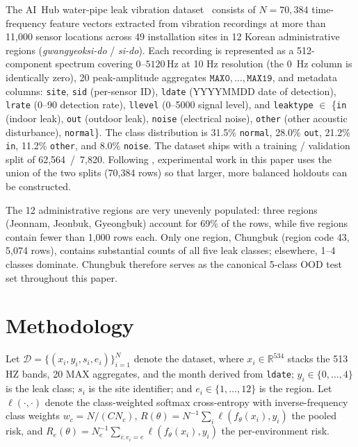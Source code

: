 \documentclass[sensors,article,submit,pdftex,oneauthor]{Definitions/mdpi}
\begin{document}
The AI~Hub water-pipe leak vibration
dataset~\cite{lee2023leak} consists of $N = 70{,}384$
time-frequency feature vectors extracted from vibration
recordings at more than 11{,}000 sensor locations across 49
installation sites in 12 Korean administrative regions
(\emph{gwangyeoksi-do} / \emph{si-do}). Each recording is
represented as a 512-component spectrum covering
$0$--$5120\,\text{Hz}$ at 10 Hz resolution (the 0~Hz column is
identically zero), 20 peak-amplitude aggregates
$\texttt{MAX0}, \dots, \texttt{MAX19}$, and metadata columns:
\texttt{site}, \texttt{sid} (per-sensor ID), \texttt{ldate}
(YYYYMMDD date of detection), \texttt{lrate} (0--90 detection
rate), \texttt{llevel} (0--5000 signal level), and
\texttt{leaktype} $\in$ \{\texttt{in} (indoor leak), \texttt{out}
(outdoor leak), \texttt{noise} (electrical noise),
\texttt{other} (other acoustic disturbance),
\texttt{normal}\}. The class distribution is 31.5\%
\texttt{normal}, 28.0\% \texttt{out}, 21.2\% \texttt{in}, 11.2\%
\texttt{other}, and 8.0\% \texttt{noise}. The dataset ships
with a training / validation split of 62{,}564~/~7{,}820.
Following \cite{lee2023leak}, experimental work in this paper
uses the union of the two splits (70{,}384 rows) so that larger,
more balanced holdouts can be constructed.

The 12 administrative regions are very unevenly populated:
three regions (Jeonnam, Jeonbuk, Gyeongbuk) account for
69\% of the rows, while five regions contain fewer than 1{,}000
rows each. Only one region, Chungbuk (region code 43,
5{,}074 rows), contains substantial counts of all five leak
classes; elsewhere, 1--4 classes dominate. Chungbuk therefore
serves as the canonical 5-class OOD test set throughout this
paper.

\section{Methodology}\label{sec:methodology}

Let $\mathcal{D} = \{(x_i, y_i, s_i, e_i)\}_{i=1}^{N}$ denote
the dataset, where $x_i \in \mathbb{R}^{534}$ stacks the 513 HZ
bands, 20 MAX aggregates, and the month derived from
\texttt{ldate}; $y_i \in \{0,\dots,4\}$ is the leak class;
$s_i$ is the site identifier; and $e_i \in \{1,\dots,12\}$ is
the region. Let $\ell(\cdot,\cdot)$ denote the class-weighted
softmax cross-entropy with inverse-frequency class weights
$w_c = N / (CN_c)$, $R(\theta) = N^{-1}\sum_i \ell(f_\theta(x_i),
y_i)$ the pooled risk, and
$R_e(\theta) = N_e^{-1}\sum_{i:e_i=e} \ell(f_\theta(x_i), y_i)$
the per-environment risk.
\end{document}
